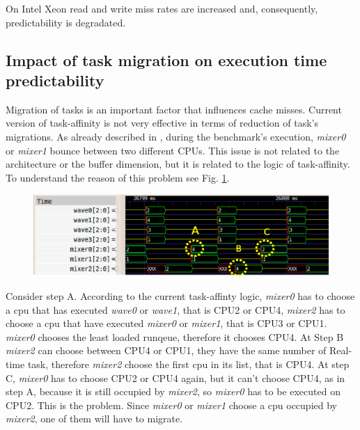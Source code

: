 On Intel Xeon read and write miss rates are increased and, consequently, predictability is degradated.

\subsection{Impact of task migration on execution time predictability}

Migration of tasks is an important factor that influences cache misses. Current version of task-affinity is not very effective in terms of reduction 
of task's migrations. As already described in \cite{lcs}, during the benchmark's execution, \textit{mixer0} or \textit{mixer1} bounce between two 
different CPUs. This issue is not related to the architecture or the buffer dimension, but it is related to the logic of task-affinity. To understand 
the reason of this problem see Fig. \ref{fig:migr_pat}.

\begin{figure}[h]
\centering
\includegraphics[width=\widefigure]{images/migr_i7.eps}
\caption{}
\label{fig:migr_pat}
\end{figure}

Consider step A. According to the current task-affinty logic, \textit{mixer0} has to choose a cpu that has executed \textit{wave0} or 
\textit{wave1}, that is CPU2 or CPU4, \textit{mixer2} has to choose a cpu that have executed \textit{mixer0} or \textit{mixer1}, that is CPU3 or 
CPU1. \textit{mixer0} chooses the least loaded runqeue, therefore it chooses CPU4. At Step B \textit{mixer2} can choose between CPU4 or CPU1, they 
have the same number of Real-time task, therefore \textit{mixer2} choose the first cpu in its list, that is CPU4. At step C, \textit{mixer0} has to 
choose CPU2 or CPU4 again, but it can't choose CPU4, as in step A, because it is still occupied by \textit{mixer2}, so \textit{mixer0} has to be 
executed on CPU2. This is the problem. Since \textit{mixer0} or \textit{mixer1} choose a cpu occupied by \textit{mixer2}, one of them will have to 
migrate.

